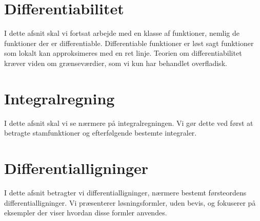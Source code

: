 














\chapter{Differentiabilitet}
I dette afsnit skal vi fortsat arbejde med en klasse af funktioner, nemlig de funktioner der er differentiable. Differentiable funktioner er løst sagt funktioner som lokalt kan approksimeres med en ret linje. Teorien om differentiabilitet kræver viden om grænseværdier, som vi kun har behandlet overfladisk.















\chapter{Integralregning}
I dette afsnit skal vi se nærmere på integralregningen. Vi gør dette ved først at betragte stamfunktioner og efterfølgende bestemte integraler. 















\chapter{Differentialligninger}
I dette afsnit betragter vi differentialligninger, nærmere bestemt førsteordens differentialligninger. Vi præsenterer løsningsformler, uden bevis, og fokuserer på eksempler der viser hvordan disse formler anvendes.



